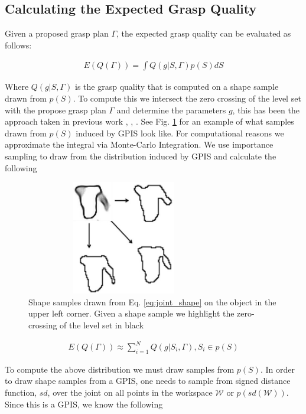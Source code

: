 \documentclass[letterpaper, 10 pt, conference]{ieeeconf}  %
\begin{document}
\subsection{Calculating the Expected Grasp Quality}
Given a proposed grasp plan $\Gamma$, the expected grasp quality can be evaluated as follows:

\vspace{-2ex}
\begin{align}\label{eq:shape_sampling}
E(Q(\Gamma)) = \int Q(g|S,\Gamma) p(S) dS
\end{align}



Where $Q(g|S,\Gamma)$ is the grasp quality that is computed on a shape sample drawn from $p(S)$. To compute this we intersect the zero crossing of the level set with the propose grasp plan $\Gamma$ and determine the parameters $g$, this has been the approach taken in previous work  \cite{kehoe2012estimating}, \cite{kehoe2012toward}, \cite{christopoulos2007handling}. See Fig. \ref{fig:shape_samples} for an example of what samples drawn from $p(S)$ induced by GPIS look like. For computational reasons we approximate the integral via Monte-Carlo Integration. We use importance sampling to draw from the distribution induced by GPIS and calculate the following

\begin{figure}[ht!]
\centering
\includegraphics[width = 8.5cm, height= 5cm ]{figures/Slide13.jpg}
\caption{Shape samples drawn from Eq. \ref{eq:joint_shape} on the object in the upper left corner. Given a shape sample we highlight the zero-crossing of the level set in black}
\vspace*{-10pt}
\label{fig:shape_samples}
\end{figure}

\begin{align*}
E(Q(\Gamma)) \approx \sum_{i=1}^N Q(g|S_i,\Gamma) , S_i \in p(S) %
\end{align*}

To compute the above distribution we must draw samples from $p(S)$. In order to draw shape samples from a GPIS, one needs to sample from signed distance function, $sd$, over the joint on all points in the workspace $\mathcal{W}$ or $p(sd(\mathcal{W}))$. Since this is a GPIS, we know the following 
\end{document}
